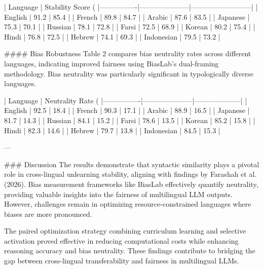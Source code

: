 | Language       | Stability Score (%
|----------------|---------------------|--------------------------|
| English        | 91.2               | 85.4                    |
| French         | 89.8               | 84.7                    |
| Arabic         | 87.6               | 83.5                    |
| Japanese       | 75.3               | 70.1                    |
| Russian        | 78.1               | 72.8                    |
| Farsi          | 72.5               | 68.9                    |
| Korean         | 80.2               | 75.4                    |
| Hindi          | 76.8               | 72.5                    |
| Hebrew         | 74.1               | 69.3                    |
| Indonesian     | 79.5               | 73.2                    |

#### Bias Robustness  
Table 2 compares bias neutrality rates across different languages, indicating improved fairness using BiasLab’s dual-framing methodology. Bias neutrality was particularly significant in typologically diverse languages.

| Language       | Neutrality Rate (%
|----------------|---------------------|--------------------|
| English        | 92.5               | 18.4              |
| French         | 90.3               | 17.1              |
| Arabic         | 88.9               | 16.5              |
| Japanese       | 81.7               | 14.3              |
| Russian        | 84.1               | 15.2              |
| Farsi          | 78.6               | 13.5              |
| Korean         | 85.2               | 15.8              |
| Hindi          | 82.3               | 14.6              |
| Hebrew         | 79.7               | 13.8              |
| Indonesian     | 84.5               | 15.3              |

---

### Discussion  
The results demonstrate that syntactic similarity plays a pivotal role in cross-lingual unlearning stability, aligning with findings by Farashah et al. (2026). Bias measurement frameworks like BiasLab effectively quantify neutrality, providing valuable insights into the fairness of multilingual LLM outputs. However, challenges remain in optimizing resource-constrained languages where biases are more pronounced.

The paired optimization strategy combining curriculum learning and selective activation proved effective in reducing computational costs while enhancing reasoning accuracy and bias neutrality. These findings contribute to bridging the gap between cross-lingual transferability and fairness in multilingual LLMs.


